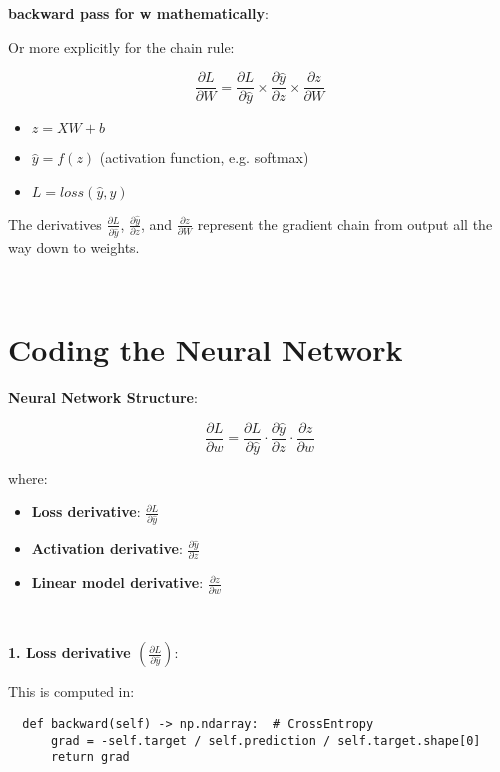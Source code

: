 \documentclass{article}
\newenvironment{cheatformula}[1][כותרת]{
    \begin{minipage}{\linewidth}
    \textbf{#1}:
}{
    \end{minipage}\\[0ex]
}
\begin{document}
\begin{multicols*}{2}
\begin{cheatformula}[backward pass for w mathematically]
Or more explicitly for the chain rule:

$$
\frac{\partial L}{\partial W} = \frac{\partial L}{\partial \hat{y}} \times \frac{\partial \hat{y}}{\partial z} \times \frac{\partial z}{\partial W}
$$

\begin{itemize}
  \item $z = XW + b$
  \item $\hat{y} = f(z)$ (activation function, e.g. softmax)
  \item $L = loss(\hat{y}, y)$
\end{itemize}

The derivatives $\frac{\partial L}{\partial \hat{y}}$, $\frac{\partial \hat{y}}{\partial z}$, and $\frac{\partial z}{\partial W}$ represent the gradient chain from output all the way down to weights.


  
\end{cheatformula}


\section{Coding the Neural Network}
\begin{cheatformula}[Neural Network Structure]

  \[
  \frac{\partial L}{\partial w} 
  = \frac{\partial L}{\partial \hat{y}} \cdot \frac{\partial \hat{y}}{\partial z} \cdot \frac{\partial z}{\partial w}
  \]
  
  where:
  \begin{itemize}
      \item \textbf{Loss derivative}: $\frac{\partial L}{\partial \hat{y}}$
      \item \textbf{Activation derivative}: $\frac{\partial \hat{y}}{\partial z}$
      \item \textbf{Linear model derivative}: $\frac{\partial z}{\partial w}$
  \end{itemize}
\end{cheatformula}

  \begin{cheatformula}[1. Loss derivative $\left(\frac{\partial L}{\partial \hat{y}}\right)$]
  This is computed in:
  
  \begin{lstlisting}
  def backward(self) -> np.ndarray:  # CrossEntropy
      grad = -self.target / self.prediction / self.target.shape[0]
      return grad
  \end{lstlisting}
  

\end{cheatformula}
\end{multicols*}
\end{document}
